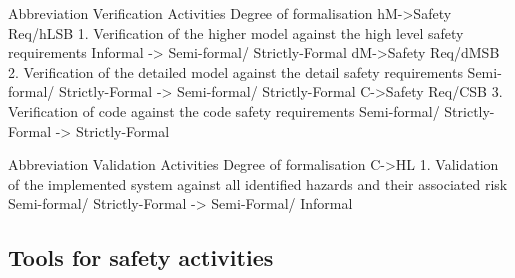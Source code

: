 \documentclass{template/openetcs_article}
\begin{document}
Abbreviation	Verification Activities	Degree of formalisation
hM->Safety Req/hLSB	1. Verification of the  higher model against the high level safety requirements	Informal -> Semi-formal/ Strictly-Formal
dM->Safety Req/dMSB	2.  Verification of the  detailed model against the detail safety requirements	Semi-formal/ Strictly-Formal -> Semi-formal/ Strictly-Formal
C->Safety Req/CSB	3. Verification of code against the code safety requirements	Semi-formal/ Strictly-Formal -> Strictly-Formal
		
Abbreviation	Validation Activities	Degree of formalisation
C->HL	1. Validation of the implemented system against all identified hazards and their associated risk	Semi-formal/ Strictly-Formal -> Semi-Formal/ Informal

\subsection{Tools for safety activities}




\nocite{*}






\begin{thebibliography}{9}



\end{thebibliography}

\end{document}
